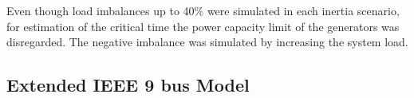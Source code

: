 Even though load imbalances up to 40\% were simulated in each inertia scenario, for estimation of the critical time the power capacity limit of the generators was disregarded. The negative imbalance was simulated by increasing the system load. %

\subsection{Extended IEEE 9 bus Model}

